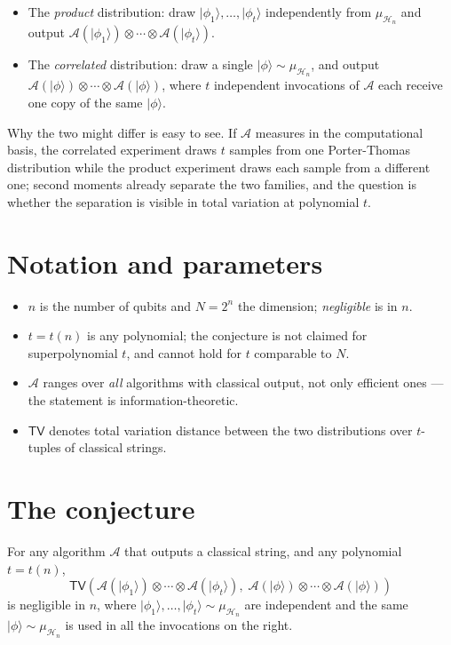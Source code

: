 \documentclass{aicr-conjecture}
\newcommand{\muH}{\mu_{\mathcal{H}_{n}}}
\newcommand{\A}{\mathcal{A}}
\newcommand{\TV}{\mathsf{TV}}
\newcommand{\ket}[1]{\lvert#1\rangle}
\begin{document}
\begin{itemize}[nosep]
  \item The \emph{product} distribution: draw
    $\ket{\phi_1}, \dots, \ket{\phi_t}$ independently from $\muH$ and
    output $\A(\ket{\phi_1}) \otimes \cdots \otimes \A(\ket{\phi_t})$.
  \item The \emph{correlated} distribution: draw a single
    $\ket{\phi} \sim \muH$, and output
    $\A(\ket{\phi}) \otimes \cdots \otimes \A(\ket{\phi})$, where $t$
    independent invocations of $\A$ each receive one copy of the same
    $\ket{\phi}$.
\end{itemize}

Why the two might differ is easy to see. If $\A$ measures in the
computational basis, the correlated experiment draws $t$ samples from one
Porter-Thomas distribution while the product experiment draws each sample
from a different one; second moments already separate the two families,
and the question is whether the separation is visible in total variation
at polynomial $t$.

\section{Notation and parameters}\label{sec:notation}

\begin{itemize}[nosep]
  \item $n$ is the number of qubits and $N = 2^{n}$ the dimension;
    \emph{negligible} is in $n$.
  \item $t = t(n)$ is any polynomial; the conjecture is not claimed for
    superpolynomial $t$, and cannot hold for $t$ comparable to $N$.
  \item $\A$ ranges over \emph{all} algorithms with classical output, not
    only efficient ones --- the statement is information-theoretic.
  \item $\TV$ denotes total variation distance between the two
    distributions over $t$-tuples of classical strings.
\end{itemize}

\section{The conjecture}\label{sec:conjectures}

\begin{conjecture}\label{conj:main}
For any algorithm $\A$ that outputs a classical string, and any
polynomial $t = t(n)$,
\[
  \TV\!\left(
    \A(\ket{\phi_1}) \otimes \cdots \otimes \A(\ket{\phi_t}),\;
    \A(\ket{\phi}) \otimes \cdots \otimes \A(\ket{\phi})
  \right)
\]
is negligible in $n$, where $\ket{\phi_1}, \dots, \ket{\phi_t} \sim \muH$
are independent and the same $\ket{\phi} \sim \muH$ is used in all the
invocations on the right.
\end{conjecture}
\end{document}
